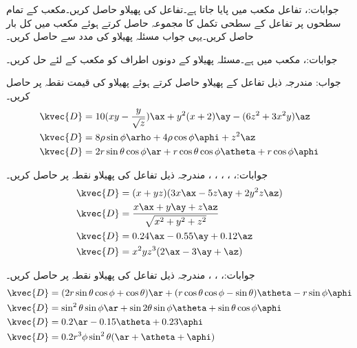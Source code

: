 جوابات:، 
تفاعل  مکعب  میں پایا جاتا ہے۔تفاعل کی پھیلاو  حاصل کریں۔مکعب کے تمام سطحوں پر تفاعل کے سطحی تکمل کا مجموعہ حاصل کرتے ہوئے مکعب میں کل بار حاصل کریں۔یہی جواب مسئلہ پھیلاو  کی مدد سے حاصل کریں۔

جوابات:، 
مکعب  میں  ہے۔مسئلہ پھیلاو کے دونوں اطراف کو مکعب کے لئے حل کریں۔

جواب:
مندرجہ ذیل تفاعل کے پھیلاو حاصل کرتے ہوئے پھیلاو کی قیمت نقطہ  پر حاصل کریں۔
\begin{align*}
\kvec{D}&=10(xy-\frac{y}{\sqrt{z}})\ax+y^2(x+2)\ay-(6z^2+3x^2y)\az\\
\kvec{D}&=8\rho \sin \phi \arho+4\rho \cos \phi \aphi+z^2\az\\
\kvec{D}&=2 r \sin \theta \cos \phi\ar +r \cos \theta \cos \phi \atheta+r \cos \phi \aphi
\end{align*}

جوابات:، ، ، ، ، 
مندرجہ ذیل تفاعل کی پھیلاو نقطہ  پر حاصل کریں۔
\begin{align*}
\kvec{D}&=(x+yz)(3x\ax-5z\ay+2y^2z\az)\\
\kvec{D}&=\frac{x\ax+y\ay+z\az}{\sqrt{x^2+y^2+z^2}}\\
\kvec{D}&=0.24\ax-0.55\ay+0.12\az\\
\kvec{D}&=x^2yz^3(2\ax-3\ay+\az)
\end{align*}

جوابات:، ، ، 
مندرجہ ذیل تفاعل کی پھیلاو نقطہ  پر حاصل کریں۔
\begin{align*}
\kvec{D}&=(2r\sin\theta\cos\phi+\cos\theta)\ar+(r\cos\theta\cos\phi-\sin\theta)\atheta-r\sin\phi\aphi\\
\kvec{D}&=\sin^2\theta\sin\phi\ar+\sin 2\theta \sin \phi\atheta+\sin\theta\cos\phi\aphi\\
\kvec{D}&=0.2\ar-0.15\atheta+0.23\aphi\\
\kvec{D}&=0.2r^3 \phi \sin^2 \theta (\ar+\atheta+\aphi)
\end{align*}

